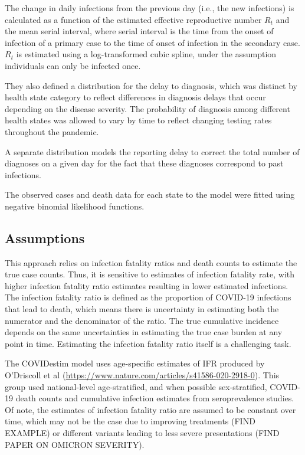 \documentclass[12pt,twoside]{smiththesis}
\begin{document}
The change in daily infections from the previous day (i.e., the new infections) is calculated as a function of the estimated effective reproductive number \(R_t\) and the mean serial interval, where serial interval is the time from the onset of infection of a primary case to the time of onset of infection in the secondary case. \(R_t\) is estimated using a log-transformed cubic spline, under the assumption individuals can only be infected once.

They also defined a distribution for the delay to diagnosis, which was distinct by health state category to reflect differences in diagnosis delays that occur depending on the disease severity.
The probability of diagnosis among different health states was allowed to vary by time to reflect changing testing rates throughout the pandemic.

A separate distribution models the reporting delay to correct the total number of diagnoses on a given day for the fact that these diagnoses correspond to past infections.

The observed cases and death data for each state to the model were fitted using negative binomial likelihood functions.

\hypertarget{assumptions}{%
\subsection{Assumptions}\label{assumptions}}

This approach relies on infection fatality ratios and death counts to estimate the true case counts. Thus, it is sensitive to estimates of infection fatality rate, with higher infection fatality ratio estimates resulting in lower estimated infections. The infection fatality ratio is defined as the proportion of COVID-19 infections that lead to death, which means there is uncertainty in estimating both the numerator and the denominator of the ratio. The true cumulative incidence depends on the same uncertainties in estimating the true case burden at any point in time. Estimating the infection fatality ratio itself is a challenging task.

The COVIDestim model uses age-specific estimates of IFR produced by O'Driscoll et al (\url{https://www.nature.com/articles/s41586-020-2918-0}). This group used national-level age-stratified, and when possible sex-stratified, COVID-19 death counts and cumulative infection estimates from seroprevalence studies. Of note, the estimates of infection fatality ratio are assumed to be constant over time, which may not be the case due to improving treatments (FIND EXAMPLE) or different variants leading to less severe presentations (FIND PAPER ON OMICRON SEVERITY).
\end{document}
